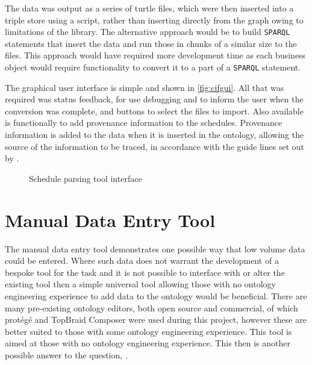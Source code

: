The data was output as a series of turtle files, which were then inserted into a triple store using a script, rather than inserting directly from the graph owing to limitations of the library. The alternative approach would be to build \texttt{SPARQL} statements that insert the data and run those in chunks of a similar size to the files. This approach would have required more development time as each business object would require functionality to convert it to a part of a \texttt{SPARQL} statement. 

The graphical user interface is simple and shown in \autoref{fig:cifgui}. All that was required was status feedback, for use debugging and to inform the user when the conversion was complete, and buttons to select the files to import. Also available is functionally to add provenance information to the schedules. Provenance information is added to the data when it is inserted in the ontology, allowing the source of the information to be traced, in accordance with the guide lines set out by \citet{Tutcher2015}.

\begin{figure}[!h]
\myfloatalign
{}
\caption{Schedule parsing tool interface}
\label{fig:cifgui}
\end{figure}

\section{Manual Data Entry Tool}
\label{sec:manualtool}
The manual data entry tool demonstrates one possible way that low volume data could be entered. Where such data does not warrant the development of a bespoke tool for the task and it is not possible to interface with or alter the existing tool then a simple universal tool allowing those with no ontology engineering experience to add data to the ontology would be beneficial. There are many pre-existing ontology editors, both open source and commercial, of which protégé and TopBraid Composer were used during this project, however these are better suited to those with some ontology engineering experience. This tool is aimed at those with no ontology engineering experience. This then is another possible answer to the question, \say{\QuestionOtherData}.

